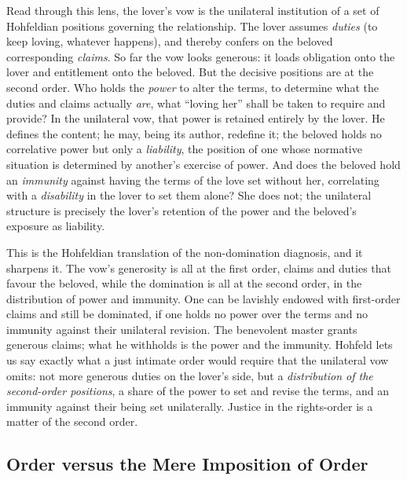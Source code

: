 Read through this lens, the lover's vow is the unilateral institution of a set of Hohfeldian positions governing the relationship. The lover assumes \emph{duties} (to keep loving, whatever happens), and thereby confers on the beloved corresponding \emph{claims}. So far the vow looks generous: it loads obligation onto the lover and entitlement onto the beloved. But the decisive positions are at the second order. Who holds the \emph{power} to alter the terms, to determine what the duties and claims actually \emph{are}, what ``loving her'' shall be taken to require and provide? In the unilateral vow, that power is retained entirely by the lover. He defines the content; he may, being its author, redefine it; the beloved holds no correlative power but only a \emph{liability}, the position of one whose normative situation is determined by another's exercise of power. And does the beloved hold an \emph{immunity} against having the terms of the love set without her, correlating with a \emph{disability} in the lover to set them alone? She does not; the unilateral structure is precisely the lover's retention of the power and the beloved's exposure as liability.

This is the Hohfeldian translation of the non-domination diagnosis, and it sharpens it. The vow's generosity is all at the first order, claims and duties that favour the beloved, while the domination is all at the second order, in the distribution of power and immunity. One can be lavishly endowed with first-order claims and still be dominated, if one holds no power over the terms and no immunity against their unilateral revision. The benevolent master grants generous claims; what he withholds is the power and the immunity. Hohfeld lets us say exactly what a just intimate order would require that the unilateral vow omits: not more generous duties on the lover's side, but a \emph{distribution of the second-order positions}, a share of the power to set and revise the terms, and an immunity against their being set unilaterally. Justice in the rights-order is a matter of the second order.

\subsection{Order versus the Mere Imposition of Order}

